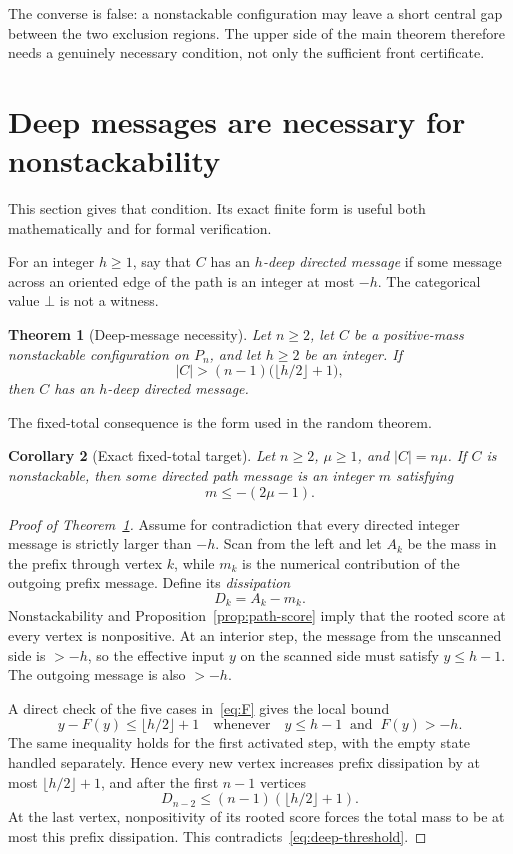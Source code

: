 \documentclass[11pt]{article}
\newtheorem{theorem}{Theorem}[section]
\newtheorem{corollary}[theorem]{Corollary}
\newcommand{\EMPTY}{\bot}
\begin{document}
The converse is false: a nonstackable configuration may leave a short central
gap between the two exclusion regions.  The upper side of the main theorem
therefore needs a genuinely necessary condition, not only the sufficient front
certificate.

\section{Deep messages are necessary for nonstackability}\label{sec:necessity}

This section gives that condition.  Its exact finite form is useful both
mathematically and for formal verification.

For an integer $h\ge1$, say that $C$ has an \emph{$h$-deep directed message}
if some message across an oriented edge of the path is an integer at most
$-h$.  The categorical value $\EMPTY$ is not a witness.

\begin{theorem}[Deep-message necessity]\label{thm:deep-general}
Let $n\ge2$, let $C$ be a positive-mass nonstackable configuration on $P_n$,
and let $h\ge2$ be an integer.  If
\[
 |C|>(n-1)\bigl(\lfloor h/2\rfloor+1\bigr),
 \tag{4.1}\label{eq:deep-threshold}
\]
then $C$ has an $h$-deep directed message.
\end{theorem}

The fixed-total consequence is the form used in the random theorem.

\begin{corollary}[Exact fixed-total target]\label{cor:deep-fixed}
Let $n\ge2$, $\mu\ge1$, and $|C|=n\mu$.  If $C$ is nonstackable, then some
directed path message is an integer $m$ satisfying
\[
 m\le-(2\mu-1).
 \tag{4.2}\label{eq:deep-fixed}
\]
\end{corollary}

\begin{proof}[Proof of Theorem~\ref{thm:deep-general}]
Assume for contradiction that every directed integer message is strictly
larger than $-h$.  Scan from the left and let $A_k$ be the mass in the prefix
through vertex $k$, while $m_k$ is the numerical contribution of the outgoing
prefix message.  Define its \emph{dissipation}
\[
 D_k=A_k-m_k.
\]
Nonstackability and Proposition~\ref{prop:path-score} imply that the rooted
score at every vertex is nonpositive.  At an interior step, the message from
the unscanned side is $>-h$, so the effective input $y$ on the scanned side
must satisfy $y\le h-1$.  The outgoing message is also $>-h$.

A direct check of the five cases in~\eqref{eq:F} gives the local bound
\[
 y-F(y)\le \lfloor h/2\rfloor+1
 \quad\text{whenever}\quad
 y\le h-1\ \text{ and }\ F(y)>-h.
 \tag{4.3}\label{eq:dissipation-local}
\]
The same inequality holds for the first activated step, with the empty state
handled separately.  Hence every new vertex increases prefix dissipation by
at most $\lfloor h/2\rfloor+1$, and after the first $n-1$ vertices
\[
 D_{n-2}\le(n-1)(\lfloor h/2\rfloor+1).
 \tag{4.4}\label{eq:dissipation-global}
\]
At the last vertex, nonpositivity of its rooted score forces the total mass to
be at most this prefix dissipation.  This contradicts~\eqref{eq:deep-threshold}.
\end{proof}
\end{document}
